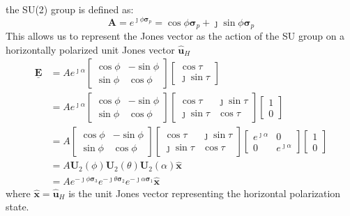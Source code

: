 \documentclass[11pt]{article}
\begin{document}
the SU(2) group is defined as:
\begin{equation}
	\mathbf{A} = e^{\jmath\phi \boldsymbol\sigma_{p}} = \cos\phi\boldsymbol\sigma_{p} + \jmath \sin\phi\boldsymbol\sigma_{p}
\end{equation}
This allows us to represent the Jones vector as the action of the SU group on a horizontally polarized unit Jones vector $\mathbf{\hat{u}}_{H}$
\begin{equation}
	\begin{split}
		\mathbf{\underline{E}} &= A e^{\jmath \alpha}
		\begin{bmatrix}
			\cos\phi &	-\sin\phi \\
			\sin\phi &	\cos\phi
		\end{bmatrix}
		\begin{bmatrix}
			\cos\tau\\
			\jmath\sin\tau
		\end{bmatrix}\\
		&=
		A e^{\jmath \alpha}
		\begin{bmatrix}
			\cos\phi &	-\sin\phi \\
			\sin\phi &	\cos\phi
		\end{bmatrix}
		\begin{bmatrix}
			\cos\tau & \jmath\sin\tau\\
			\jmath\sin\tau & \cos\tau
		\end{bmatrix}
		\begin{bmatrix}
		1\\
		0
		\end{bmatrix}\\
		&=
		A 
		\begin{bmatrix}
			\cos\phi &	-\sin\phi \\
			\sin\phi &	\cos\phi
		\end{bmatrix}
		\begin{bmatrix}
			\cos\tau & \jmath\sin\tau\\
			\jmath\sin\tau & \cos\tau
		\end{bmatrix}
		\begin{bmatrix}
		e^{\jmath\alpha} & 0 \\
		0 & e^{\jmath\alpha}
		\end{bmatrix}
		\begin{bmatrix}
		1\\
		0
		\end{bmatrix}\\
		&= A \mathbf{U}_{2}\left(\phi\right) \mathbf{U}_{2}\left(\theta\right)\mathbf{U}_{2}\left(\alpha\right)\mathbf{\hat{x}}\\
		&=A e^{-\jmath\phi\boldsymbol\sigma_{3}}e^{-\jmath\theta\boldsymbol\sigma_{2}}e^{-\jmath\alpha\boldsymbol\sigma_{1}}\mathbf{\hat{x}}
	\end{split}
\end{equation}
where $\mathbf{\hat{x}} = \mathbf{\hat{u}}_{H}$ is the unit Jones vector representing the horizontal polarization state.
\end{document}
